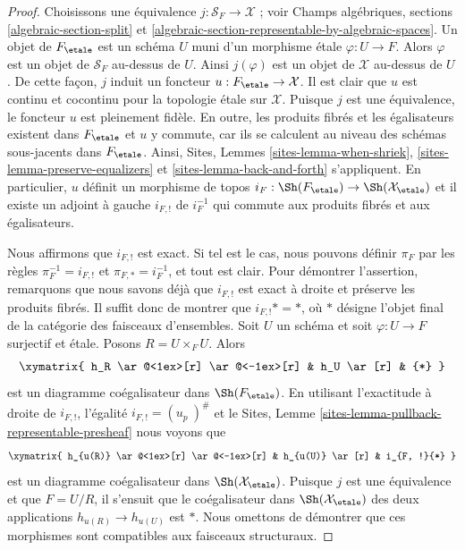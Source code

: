 \begin{proof}
Choisissons une équivalence $j : \mathcal{S}_F \to \mathcal{X}$ ; voir
Champs algébriques, sections \ref{algebraic-section-split} et
\ref{algebraic-section-representable-by-algebraic-spaces}.
Un objet de $F_\etale$ est un schéma $U$ muni d'un
morphisme \'etale $\varphi : U \to F$. Alors $\varphi$ est un objet
de $\mathcal{S}_F$ au-dessus de $U$. Ainsi $j(\varphi)$ est un objet de
$\mathcal{X}$ au-dessus de $U$. De cette façon, $j$ induit un foncteur
$u : F_\etale \to \mathcal{X}$. Il est clair que
$u$ est continu et cocontinu pour la topologie \'etale sur
$\mathcal{X}$. Puisque $j$ est une équivalence, le foncteur $u$ est pleinement
fidèle. En outre, les produits fibrés et les égalisateurs existent dans $F_\etale$
et $u$ y commute, car ils se calculent au niveau
des schémas sous-jacents dans $F_\etale$. Ainsi,
Sites, Lemmes \ref{sites-lemma-when-shriek},
\ref{sites-lemma-preserve-equalizers} et
\ref{sites-lemma-back-and-forth}
s'appliquent. En particulier, $u$ définit un morphisme de topos
$i_F : \Sh(F_\etale) \to \Sh(\mathcal{X}_\etale)$
et il existe un adjoint à gauche $i_{F, !}$ de $i_F^{-1}$ qui commute
aux produits fibrés et aux égalisateurs.

\medskip\noindent
Nous affirmons que $i_{F, !}$ est exact. Si tel est le cas, nous pouvons définir
$\pi_F$ par les règles $\pi_F^{-1} = i_{F, !}$ et $\pi_{F, *} = i_F^{-1}$,
et tout est clair. Pour démontrer l'assertion, remarquons que nous savons déjà
que $i_{F, !}$
est exact à droite et préserve les produits fibrés. Il suffit donc de montrer
que $i_{F, !}* = *$, où $*$ désigne l'objet final de la catégorie
des faisceaux d'ensembles. Soit $U$ un schéma et soit
$\varphi : U \to F$ surjectif et \'etale. Posons $R = U \times_F U$.
Alors
$$
\xymatrix{
h_R \ar@<1ex>[r] \ar@<-1ex>[r] & h_U \ar[r] & {*}
}
$$
est un diagramme coégalisateur dans $\Sh(F_\etale)$. En utilisant
l'exactitude à droite de $i_{F, !}$, l'égalité $i_{F, !} = (u_p\ )^\#$ et le
Sites, Lemme \ref{sites-lemma-pullback-representable-presheaf}
nous voyons que
$$
\xymatrix{
h_{u(R)} \ar@<1ex>[r] \ar@<-1ex>[r] & h_{u(U)} \ar[r] & i_{F, !}{*}
}
$$
est un diagramme coégalisateur dans $\Sh(\mathcal{X}_\etale)$. Puisque
$j$ est une équivalence et que $F = U/R$, il s'ensuit que
le coégalisateur dans $\Sh(\mathcal{X}_\etale)$ des
deux applications $h_{u(R)} \to h_{u(U)}$ est $*$. Nous omettons de démontrer que
ces morphismes sont compatibles aux faisceaux structuraux.
\end{proof}

